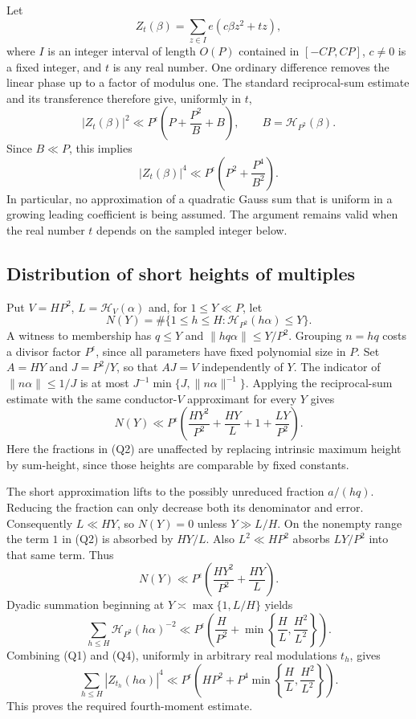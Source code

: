 \documentclass[11pt,letterpaper]{article}
\numberwithin{equation}{section}
\begin{document}
Let
\[
 Z_t(\beta)=\sum_{z\in I}e(c\beta z^2+tz),
\]
where $I$ is an integer interval of length $O(P)$ contained in
$[-CP,CP]$, $c\ne0$ is a fixed integer, and $t$ is any real number.
One ordinary difference removes the linear phase up to a factor of modulus
one. The standard reciprocal-sum estimate and its transference therefore give,
uniformly in $t$,
\[
 |Z_t(\beta)|^2\ll P^\epsilon
       \left(P+\frac{P^2}{B}+B\right),\qquad
 B=\mathcal H_{P^2}(\beta).
\]
Since $B\ll P$, this implies
\[
 |Z_t(\beta)|^4\ll P^\epsilon
                   \left(P^2+\frac{P^4}{B^2}\right).       \tag{Q1}
\]
In particular, no approximation of a quadratic Gauss sum that is uniform in
a growing leading coefficient is being assumed. The argument remains valid
when the real number $t$ depends on the sampled integer below.

\subsection{Distribution of short heights of multiples}

Put $V=HP^2$, $L=\mathcal H_V(\alpha)$ and, for $1\le Y\ll P$, let
\[
 N(Y)=\#\{1\le h\le H:
                 \mathcal H_{P^2}(h\alpha)\le Y\}.
\]
A witness to membership has $q\le Y$ and
$\|hq\alpha\|\le Y/P^2$. Grouping $n=hq$ costs a divisor factor
$P^\epsilon$, since all parameters have fixed polynomial size in $P$.
Set $A=HY$ and $J=P^2/Y$, so that $AJ=V$ independently of $Y$.
The indicator of $\|n\alpha\|\le1/J$ is at most
$J^{-1}\min\{J,\|n\alpha\|^{-1}\}$. Applying the reciprocal-sum
estimate with the same conductor-$V$ approximant for every $Y$ gives
\[
 N(Y)\ll P^\epsilon
       \left(\frac{HY^2}{P^2}+\frac{HY}{L}+1+\frac{LY}{P^2}\right).
                                                               \tag{Q2}
\]
Here the fractions in (Q2) are unaffected by replacing intrinsic maximum
height by sum-height, since those heights are comparable by fixed constants.

The short approximation lifts to the possibly unreduced fraction $a/(hq)$.
Reducing the fraction can only decrease both its denominator and error.
Consequently $L\ll HY$, so $N(Y)=0$ unless $Y\gg L/H$.
On the nonempty range the term $1$ in (Q2) is absorbed by $HY/L$.
Also $L^2\ll HP^2$ absorbs $LY/P^2$ into that same term. Thus
\[
 N(Y)\ll P^\epsilon\left(\frac{HY^2}{P^2}+\frac{HY}{L}\right).
                                                               \tag{Q3}
\]
Dyadic summation beginning at $Y\asymp\max\{1,L/H\}$ yields
\[
 \sum_{h\le H}\mathcal H_{P^2}(h\alpha)^{-2}
 \ll P^\epsilon\left(\frac H{P^2}+
                  \min\left\{\frac HL,\frac{H^2}{L^2}\right\}\right).
                                                               \tag{Q4}
\]
Combining (Q1) and (Q4), uniformly in arbitrary real modulations $t_h$, gives
\[
 \sum_{h\le H}|Z_{t_h}(h\alpha)|^4
 \ll P^\epsilon\left(HP^2+
             P^4\min\left\{\frac HL,\frac{H^2}{L^2}\right\}\right).
                                                               \tag{Q5}
\]
This proves the required fourth-moment estimate.
\end{document}
